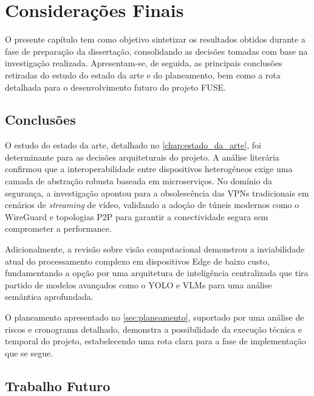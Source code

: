 
\chapter{Considerações Finais}
\label{chap:conclusoes}
O presente capítulo tem como objetivo sintetizar os resultados obtidos durante a fase de preparação da dissertação, consolidando as decisões tomadas com base na investigação realizada. Apresentam-se, de seguida, as principais conclusões retiradas do estudo do estado da arte e do planeamento, bem como a rota detalhada para o desenvolvimento futuro do projeto \gls{FUSE}.

\section{Conclusões}
\label{sec:conclusoes_finais}

O estudo do estado da arte, detalhado no \autoref{chap:estado_da_arte}, foi determinante para as decisões arquiteturais do projeto. A análise literária confirmou que a interoperabilidade entre dispositivos heterogéneos exige uma camada de abstração robusta baseada em microserviços. No domínio da segurança, a investigação apontou para a obsolescência das \glspl{VPN} tradicionais em cenários de \textit{streaming} de vídeo, validando a adoção de túneis modernos como o WireGuard e topologias \gls{P2P} para garantir a conectividade segura sem comprometer a performance. 

Adicionalmente, a revisão sobre visão computacional demonstrou a inviabilidade atual do processamento complexo em dispositivos Edge de baixo custo, fundamentando a opção por uma arquitetura de inteligência centralizada que tira partido de modelos avançados como o \gls{YOLO} e \glspl{VLM} para uma análise semântica aprofundada.

O planeamento apresentado no \autoref{sec:planeamento}, suportado por uma análise de riscos e cronograma detalhado, demonstra a possibilidade da execução técnica e temporal do projeto, estabelecendo uma rota clara para a fase de implementação que se segue.



\section{Trabalho Futuro}
\label{sec:trabalho_futuro}


